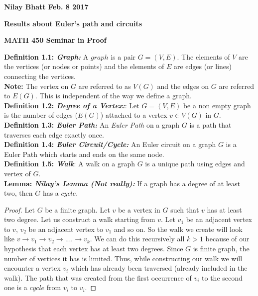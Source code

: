 \documentclass[12pt, fullpage]{article}
\begin{document}
\begin{flushleft}
\textbf{Nilay Bhatt Feb. 8 2017}		
\end{flushleft}
\begin{center}
	\textbf{Results about Euler's path and circuits}
\end{center}
\begin{center}
		
{\bf MATH 450 Seminar in Proof}
 \\
\end{center}
\textbf{Definition 1.1: \textit{Graph: }}A $graph$ is a pair $G = (V,E)$. The elements of $V$ are the vertices (or nodes or points) and the elements of $E$ are edges (or lines) connecting the vertices.\\

\textbf{Note:}	The vertex on $G$ are referred to as $V(G)$ and the edges on $G$ are referred to $E(G)$. This is independent of the way we define a graph.\\

\textbf{Definition 1.2: \textit{Degree of a Vertex:}}: Let $G = (V,E)$ be a non empty graph is the number of edges ($E(G)$) attached to a vertex $v \in V(G)$ in $G$.\\

\textbf{Definition 1.3: \textit{Euler Path: }}An \textit{Euler Path} on a graph $G$ is a path that traverses each edge exactly once.\\

\textbf{Definition 1.4: \textit{Euler Circuit/Cycle: }}An Euler circuit on a graph $G$ is a Euler Path which starts and ends on the same node.\\

\textbf{Definition 1.5: \textit{Walk}}: A walk on a graph $G$ is a unique path using edges and vertex of $G$.\\

\textbf{Lemma: \textit{Nilay's Lemma (Not really):}} If a graph has a degree of at least two, then $G$ has a $cycle$.
\begin{proof}
Let $G$ be a finite graph. Let $v$ be a vertex in $G$ such that $v$ has at least two degree. Let us construct a walk starting from $v$. Let $v_1$ be an adjacent vertex to $v$, $v_2$ be an adjacent vertex to $v_1$ and so on. So the walk we create will look like $v \rightarrow v_1 \rightarrow v_2 \rightarrow ....\rightarrow v_k$. We can do this recursively all $k>1$ because of our hypothesis that each vertex has at least two degrees. Since $G$ is finite graph, the number of vertices it has is limited. Thus, while constructing our walk we will encounter a vertex $v_i$ which has already been traversed (already included in the walk). The path that was created from the first occurrence of $v_i$ to the second one is a $cycle$ from $v_i$ to $v_i$.
\end{proof}
\end{document}
